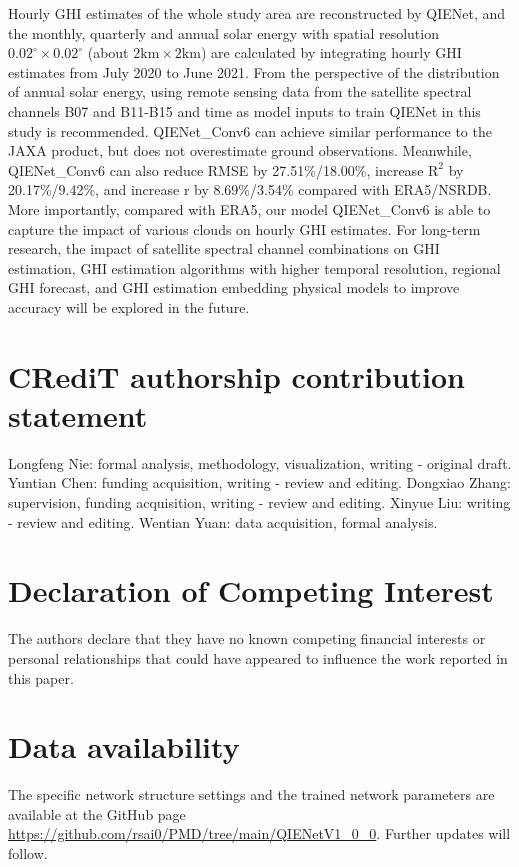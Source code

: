 \documentclass[review]{elsarticle}
\begin{document}
Hourly GHI estimates of the whole study area are reconstructed by QIENet, and the monthly, quarterly and annual solar energy with spatial resolution $0.02^{\circ}\times0.02^{\circ}$ (about $\mathrm{2km \times 2km}$) are calculated by integrating hourly GHI estimates from July 2020 to June 2021.
From the perspective of the distribution of annual solar energy, using remote sensing data from the satellite spectral channels B07 and B11-B15 and time as model inputs to train QIENet in this study is recommended.
QIENet\_Conv6 can achieve similar performance to the JAXA product, but does not overestimate ground observations.
Meanwhile, QIENet\_Conv6 can also reduce RMSE by 27.51\%/18.00\%, increase $\mathrm{R^{2}}$ by 20.17\%/9.42\%, and increase r by 8.69\%/3.54\% compared with ERA5/NSRDB.
More importantly, compared with ERA5, our model QIENet\_Conv6 is able to capture the impact of various clouds on hourly GHI estimates.
For long-term research, the impact of satellite spectral channel combinations on GHI estimation, GHI estimation algorithms with higher temporal resolution, regional GHI forecast, and GHI estimation embedding physical models to improve accuracy will be explored in the future.

\section*{CRediT authorship contribution statement}
Longfeng Nie: formal analysis, methodology, visualization, writing - original draft. Yuntian Chen: funding acquisition, writing - review and editing. Dongxiao Zhang: supervision, funding acquisition, writing - review and editing. Xinyue Liu: writing - review and editing. Wentian Yuan: data acquisition, formal analysis.

\section*{Declaration of Competing Interest}
The authors declare that they have no known competing financial interests or personal relationships that could have appeared to influence the work reported in this paper.

\section*{Data availability}
The specific network structure settings and the trained network parameters are available at the GitHub page \href{https://github.com/rsai0/PMD/tree/main/QIENetV1_0_0}{https://github.com/rsai0/PMD/tree/main/QIENetV1\_0\_0}. Further updates will follow.
\end{document}
